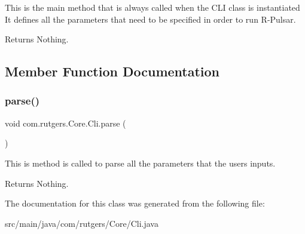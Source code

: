 This is the main method that is always called when the C\+LI class is instantiated It defines all the parameters that need to be specified in order to run R-\/\+Pulsar. \begin{DoxyReturn}{Returns}
Nothing. 
\end{DoxyReturn}


\subsection{Member Function Documentation}
\mbox{\label{classcom_1_1rutgers_1_1Core_1_1Cli_aaee909416b9655051fbea7611b41d1d4}} 
\subsubsection{\texorpdfstring{parse()}{parse()}}
{\footnotesize\ttfamily void com.\+rutgers.\+Core.\+Cli.\+parse (\begin{DoxyParamCaption}{ }\end{DoxyParamCaption})}

This is method is called to parse all the parameters that the users inputs. \begin{DoxyReturn}{Returns}
Nothing. 
\end{DoxyReturn}


The documentation for this class was generated from the following file\+:\begin{DoxyCompactItemize}
\item 
src/main/java/com/rutgers/\+Core/Cli.\+java\end{DoxyCompactItemize}
